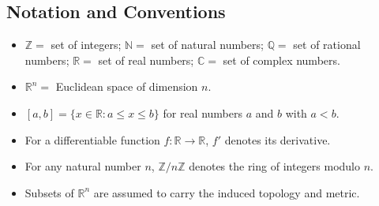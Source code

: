 \documentclass[11pt, a4paper]{article}
\begin{document}
\subsection*{Notation and Conventions}
\begin{itemize}
  \item $\mathbb{Z} =$ set of integers; $\mathbb{N} =$ set of natural numbers; $\mathbb{Q} =$ set of rational numbers; $\mathbb{R} =$ set of real numbers; $\mathbb{C} =$ set of complex numbers.
  \item $\mathbb{R}^n =$ Euclidean space of dimension $n$.
  \item $[a, b] = \{x \in \mathbb{R} : a \le x \le b\}$ for real numbers $a$ and $b$ with $a < b$.
  \item For a differentiable function $f: \mathbb{R} \to \mathbb{R}$, $f'$ denotes its derivative.
  \item For any natural number $n$, $\mathbb{Z}/n\mathbb{Z}$ denotes the ring of integers modulo $n$.
  \item Subsets of $\mathbb{R}^n$ are assumed to carry the induced topology and metric.
\end{itemize}
\end{document}
